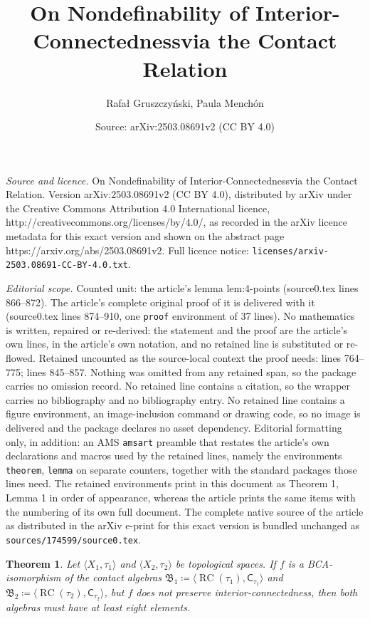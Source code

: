 \documentclass[10pt,a4paper]{amsart}
\title{On Nondefinability of Interior-Connectedness\break via the Contact Relation}
\author{Rafa{\l} Gruszczy\'nski, Paula Mench\'on}
\date{Source: arXiv:2503.08691v2 (CC BY 4.0)}
\newtheorem{theorem}{Theorem}
\DeclareMathOperator{\RCvtex}{RC}
\begin{document}
\maketitle

\noindent\emph{Source and licence.} On Nondefinability of Interior-Connectedness\break via the Contact Relation. Version arXiv:2503.08691v2 (CC BY 4.0), distributed by arXiv under the Creative Commons Attribution 4.0 International licence, http://creativecommons.org/licenses/by/4.0/, as recorded in the arXiv licence metadata for this exact version and shown on the abstract page https://arxiv.org/abs/2503.08691v2. Full licence notice: \texttt{licenses/arxiv-2503.08691-CC-BY-4.0.txt}.\par\smallskip

\noindent\textit{Editorial scope.} Counted unit: the article's lemma lem:4-points (source0.tex lines 866--872). The article's complete original proof of it is delivered with it (source0.tex lines 874--910, one \texttt{proof} environment of 37 lines). No mathematics is written, repaired or re-derived: the statement and the proof are the article's own lines, in the article's own notation, and no retained line is substituted or re-flowed.  Retained uncounted as the source-local context the proof needs: lines 764--775; lines 845--857.  Nothing was omitted from any retained span, so the package carries no omission record.  No retained line contains a citation, so the wrapper carries no bibliography and no bibliography entry.  No retained line contains a figure environment, an image-inclusion command or drawing code, so no image is delivered and the package declares no asset dependency.  Editorial formatting only, in addition: an AMS \texttt{amsart} preamble that restates the article's own declarations and macros used by the retained lines, namely the environments \texttt{theorem}, \texttt{lemma} on separate counters, together with the standard packages those lines need.  The retained environments print in this document as Theorem 1, Lemma 1 in order of appearance, whereas the article prints the same items with the numbering of its own full document.  The complete native source of the article as distributed in the arXiv e-print for this exact version is bundled unchanged as \texttt{sources/174599/source0.tex}.
\begin{theorem}%
\label{th:8-elements}
Let $  \langle X_{1},\tau _{1}  \rangle $ and
$  \langle X_{2},\tau _{2}  \rangle $ be topological spaces. If
$f$ is a BCA-isomorphism of the contact algebras
$\mathfrak{B}_1\coloneqq  \langle \RCvtex (\tau _{1}),\mathord{\mathrel{\mathsf{C}}_{\tau _{1}}}
  \rangle $ and
$\mathfrak{B}_2\coloneqq  \langle \RCvtex (\tau _{2}),\mathord{\mathrel{\mathsf{C}}_{\tau _{2}}}
  \rangle $, but $f$ does not preserve interior-connectedness, then
both algebras must have at least eight elements.
\end{theorem}
\end{document}

